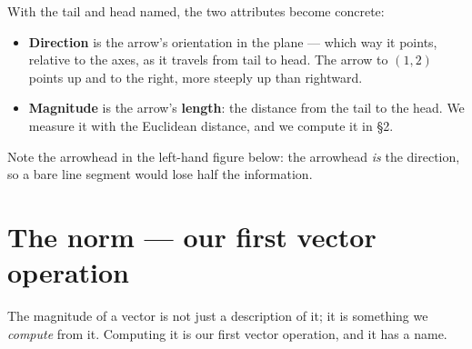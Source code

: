 \documentclass[11pt]{article}
\theoremstyle{definition}
\theoremstyle{remark}
\newcommand{\vc}[1]{\mathbf{#1}}
\newcommand{\lattice}[4]{%
  \draw[step=1cm,gray!25,very thin] (#1,#3) grid (#2,#4);
  \draw[axisline] (#1,0) -- (#2+0.45,0) node[right,font=\scriptsize,black]{$x$};
  \draw[axisline] (0,#3) -- (0,#4+0.45) node[above,font=\scriptsize,black]{$y$};
}
\begin{document}
\noindent With the tail and head named, the two attributes become concrete:

\begin{itemize}[leftmargin=1.4em,itemsep=2pt]
  \item \textbf{Direction} is the arrow's orientation in the plane --- which way
        it points, relative to the axes, as it travels from tail to head. The
        arrow to $(1,2)$ points up and to the right, more steeply up than
        rightward.
  \item \textbf{Magnitude} is the arrow's \textbf{length}: the distance from the
        tail to the head. We measure it with the Euclidean distance, and we
        compute it in \S2.
\end{itemize}

\noindent Note the arrowhead in the left-hand figure below: the arrowhead
\emph{is} the direction, so a bare line segment would lose half the
information.

\begin{center}
\hspace{1.4cm}
\end{center}

\section{The norm --- our first vector operation}
The magnitude of a vector is not just a description of it; it is something we
\emph{compute} from it. Computing it is our first vector operation, and it has a
name.
\end{document}
